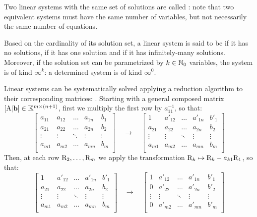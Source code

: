 Two linear systems with the same set of solutions are called : note that two equivalent systems must have the same number of variables, but not necessarily the same number of equations.

Based on the cardinality of its solution set, a linear system is said to be  if it has no solutions,  if it has one solution and  if it has infinitely-many solutions. Moreover, if the solution set can be parametrized by $ k \in \mathbb{N}_0 $ variables, the system is of kind $ \infty^k $: a determined system is of kind $ \infty^0 $.

Linear systems can be systematically solved applying a reduction algorithm to their corresponding matrices: . Starting with a general composed matrix $ [\mathrm{A} | \mathbf{b}] \in \mathbb{K}^{m \times (n+1)} $, first we multiply the first row by $ a_{11}^{-1} $, so that:
\begin{equation*}
  \left[
  \begin{array}{cccc|c}
    a_{11} & a_{12} & \dots & a_{1n} & b_1 \\
    a_{21} & a_{22} & \dots & a_{2n} & b_2 \\
    \vdots & \vdots & \ddots & \vdots & \vdots \\
    a_{m1} & a_{m2} & \dots & a_{mn} & b_m \\
  \end{array}
  \right]
  \quad \longrightarrow \quad
 \left[
  \begin{array}{cccc|c}
    1 & a'_{12} & \dots & a'_{1n} & b'_1 \\
    a_{21} & a_{22} & \dots & a_{2n} & b_2 \\
    \vdots & \vdots & \ddots & \vdots & \vdots \\
    a_{m1} & a_{m2} & \dots & a_{mn} & b_m \\
  \end{array}
  \right]
\end{equation*}
Then, at each row $ \mathrm{R}_2 , \dots , \mathrm{R}_m $ we apply the transformation $ \mathrm{R}_k \mapsto \mathrm{R}_k - a_{k1} \mathrm{R}_1 $, so that:
\begin{equation*}
  \left[
  \begin{array}{cccc|c}
    1 & a'_{12} & \dots & a'_{1n} & b'_1 \\
    a_{21} & a_{22} & \dots & a_{2n} & b_2 \\
    \vdots & \vdots & \ddots & \vdots & \vdots \\
    a_{m1} & a_{m2} & \dots & a_{mn} & b_m \\
  \end{array}
  \right]
  \quad \longrightarrow \quad
 \left[
  \begin{array}{cccc|c}
    1 & a'_{12} & \dots & a'_{1n} & b'_1 \\
    0 & a'_{22} & \dots & a'_{2n} & b'_2 \\
    \vdots & \vdots & \ddots & \vdots & \vdots \\
    0 & a'_{m2} & \dots & a'_{mn} & b'_m \\
  \end{array}
  \right]
\end{equation*}
